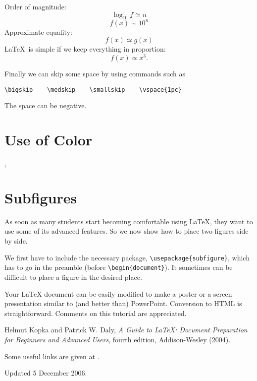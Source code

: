 \documentclass[12pt]{article}
\begin{document}
\noindent Order of magnitude:
\begin{equation}
\log_{10}f \simeq n
\end{equation}
\begin{equation}
f(x)\sim 10^{n}
\end{equation}
Approximate equality:
\begin{equation}
f(x)\simeq g(x)
\end{equation}
\LaTeX\ is simple if we keep everything in proportion:
\begin{equation}
f(x) \propto x^3 .
\end{equation}

Finally we can skip some space by using commands such as
\begin{verbatim}
\bigskip    \medskip    \smallskip    \vspace{1pc}
\end{verbatim}
The space can be negative.

\section{\color{red}Use of Color}

{\color{blue}{We can change colors for emphasis}},
{\color{green}{but}} {\color{cyan}{who is going pay for the ink?}}

\section{\label{morefig}Subfigures}

As soon as many students start becoming comfortable using \LaTeX, they want
to use some of its advanced features. So we now show how to place two
figures side by side.



We first have to include the necessary package,
\verb+\usepackage{subfigure}+, which has to go in the preamble (before
\verb+\begin{document}+). It sometimes can be difficult to place a figure in
the desired place.

Your LaTeX document can be easily modified to make a poster or a screen
presentation similar to (and better than) PowerPoint. Conversion to HTML is
straightforward. Comments on this tutorial are appreciated.

\begin{thebibliography}{5}

Helmut Kopka and Patrick W. Daly, \textsl{A Guide to
\LaTeX: Document Preparation for Beginners and Advanced Users},
fourth edition, Addison-Wesley (2004).

Some useful links are
given at \url{}.

\end{thebibliography}

{\small \noindent Updated 5 December 2006.}
\end{document}
